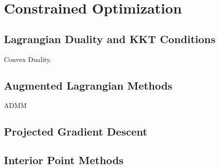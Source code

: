 \section{Constrained Optimization}

\subsection{Lagrangian Duality and KKT Conditions}

	Convex Duality. 

\subsection{Augmented Lagrangian Methods}

	ADMM 

\subsection{Projected Gradient Descent}

\subsection{Interior Point Methods}
